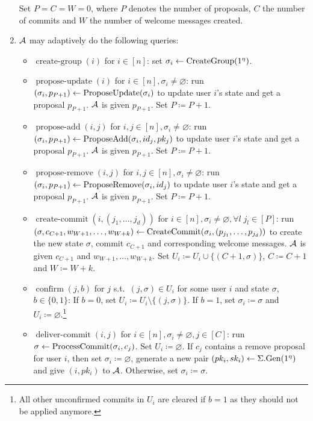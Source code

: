\begin{definition}
\begin{enumerate}[1.]
		      Set $P = C = W = 0$, where $P$ denotes the number of proposals, $C$ the number of commits and $W$ the number of welcome messages created.
		\item $\mathcal{A}$ may adaptively do the following queries:
		      \begin{itemize}
			      \item $\operatorname{create-group}(i)$ for $i \in [n]$: set $\sigma_i \leftarrow \operatorname{CreateGroup}(1^\eta)$.
			      \item $\operatorname{propose-update}(i)$ for $i \in [n], \sigma_i \neq \varnothing$: run $(\sigma_i, p_{P + 1}) \leftarrow \operatorname{ProposeUpdate}(\sigma_i)$ to update user $i$'s state and get a proposal $p_{P + 1}$. $\mathcal{A}$ is given $p_{P + 1}$. Set $P \coloneqq P + 1$.
			      \item $\operatorname{propose-add}(i, j)$ for $i, j \in [n], \sigma_i \neq \varnothing$: run $(\sigma_i, p_{P + 1}) \leftarrow \operatorname{ProposeAdd}(\sigma_i, id_j, pk_j)$ to update user $i$'s state and get a proposal $p_{P + 1}$. $\mathcal{A}$ is given $p_{P + 1}$. Set $P \coloneqq P + 1$.
			      \item $\operatorname{propose-remove}(i, j)$ for $i, j \in [n], \sigma_i \neq \varnothing$: run $(\sigma_i, p_{P + 1}) \leftarrow \operatorname{ProposeRemove}(\sigma_i, id_j)$ to update user $i$'s state and get a proposal $p_{P + 1}$. $\mathcal{A}$ is given $p_{P + 1}$. Set $P \coloneqq P + 1$.
			      \item $\operatorname{create-commit}(i, (j_1, \ldots, j_d))$ for $i \in [n], \sigma_i \neq \varnothing, \forall l \; j_l \in [P]$: run $(\sigma, c_{C + 1}, w_{W + 1}, \ldots, w_{W + k}) \leftarrow \operatorname{CreateCommit}(\sigma_i, (p_{j_1}, \ldots, p_{j_d}))$ to create the new state $\sigma$, commit $c_{C + 1}$ and corresponding welcome messages. $\mathcal{A}$ is given $c_{C + 1}$ and $w_{W + 1}, \ldots, w_{W + k}$. Set $U_i \coloneqq U_i \cup \{(C + 1, \sigma)\}$, $C \coloneqq C + 1$ and $W \coloneqq W + k$.
			      \item $\operatorname{confirm}(j, b)$ for $j$ s.t.~$(j, \sigma) \in U_i$ for some user $i$ and state $\sigma$, $b \in \{0, 1\}$: If $b = 0$, set $U_i \coloneqq U_i \setminus \{(j, \sigma)\}$. If $b = 1$, set $\sigma_i \coloneqq \sigma$ and $U_i \coloneqq \varnothing$.\footnote{All other unconfirmed commits in $U_i$ are cleared if $b = 1$ as they should not be applied anymore.}
			      \item $\operatorname{deliver-commit}(i, j)$ for $i \in [n], \sigma_i \neq \varnothing, j \in [C]$: run $\sigma \leftarrow \operatorname{ProcessCommit}(\sigma_i, c_j)$. Set $U_i \coloneqq \varnothing$. If $c_j$ contains a remove proposal for user $i$, then set $\sigma_i \coloneqq \varnothing$, generate a new pair $(pk_i, sk_i) \leftarrow \Sigma.\mathrm{Gen}(1^\eta)$ and give $(i, pk_i)$ to $\mathcal{A}$. Otherwise, set $\sigma_i \coloneqq \sigma$.

\end{itemize}
\end{enumerate}
\end{definition}

